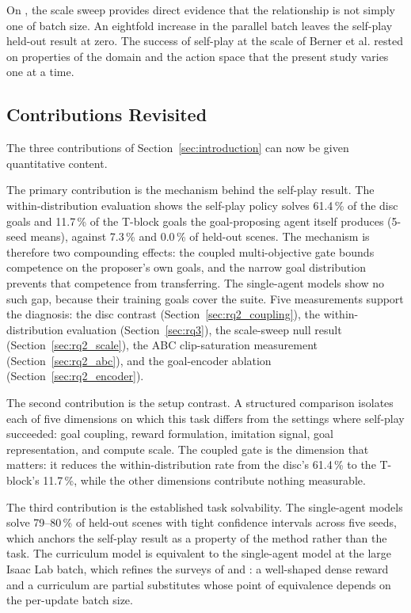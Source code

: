 On \cite{Berner2019Dota2}, the scale sweep provides direct evidence that the
relationship is not simply one of batch size. An eightfold increase in the
parallel batch leaves the self-play held-out result at zero. The success of
self-play at the scale of Berner et al. rested on properties of the domain and
the action space that the present study varies one at a time.

\subsection{Contributions Revisited}
\label{sec:contributions}

The three contributions of Section~\ref{sec:introduction} can now be given
quantitative content.

The primary contribution is the mechanism behind the self-play result. The
within-distribution evaluation shows the self-play policy solves 61.4\,\% of the
disc goals and 11.7\,\% of the T-block goals the goal-proposing agent itself
produces (5-seed means), against 7.3\,\% and 0.0\,\% of held-out scenes. The
mechanism is therefore two compounding effects: the coupled multi-objective gate
bounds competence on the proposer's own goals, and the narrow goal distribution
prevents that competence from transferring. The single-agent models show no such
gap, because their training goals cover the suite. Five measurements support the
diagnosis: the disc contrast (Section~\ref{sec:rq2_coupling}), the
within-distribution evaluation (Section~\ref{sec:rq3}), the scale-sweep null
result (Section~\ref{sec:rq2_scale}), the ABC clip-saturation measurement
(Section~\ref{sec:rq2_abc}), and the goal-encoder ablation
(Section~\ref{sec:rq2_encoder}).

The second contribution is the setup contrast. A structured comparison isolates
each of five dimensions on which this task differs from the settings where self-play
succeeded: goal coupling, reward formulation, imitation signal, goal
representation, and compute scale. The coupled gate is the dimension that
matters: it reduces the within-distribution rate from the disc's 61.4\,\% to the
T-block's 11.7\,\%, while the other dimensions contribute nothing measurable.

The third contribution is the established task solvability. The single-agent
models solve 79--80\,\% of held-out scenes with tight confidence intervals
across five seeds, which anchors the self-play result as a property of the
method rather than the task. The curriculum model is equivalent to the
single-agent model at the large Isaac Lab batch, which refines the surveys of
\cite{Narvekar2020} and \cite{Portelas2020ACLSurvey}: a well-shaped dense reward
and a curriculum are partial substitutes whose point of equivalence depends on
the per-update batch size.

